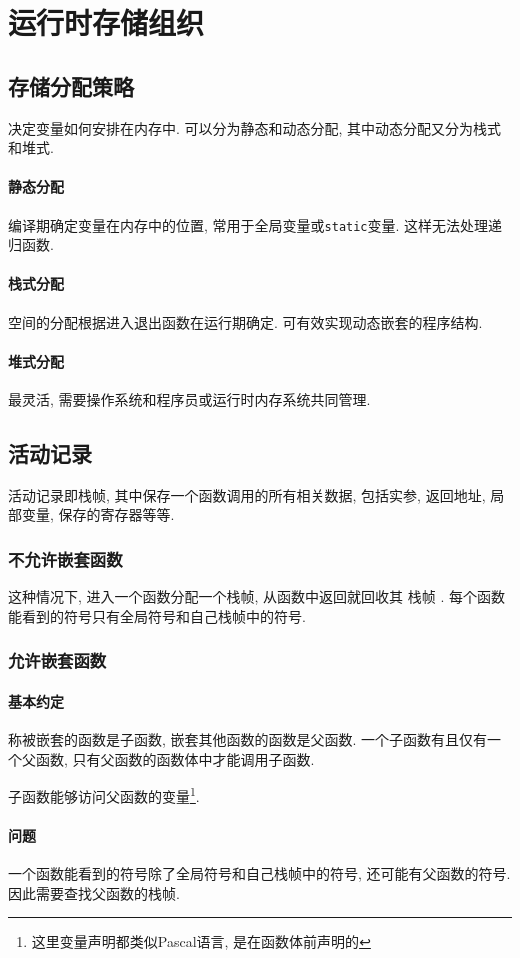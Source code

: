 \documentclass{ctexart}
\begin{document}
\section{运行时存储组织}
\subsection{存储分配策略}
    决定变量如何安排在内存中. 可以分为静态和动态分配, 其中动态分配又分为栈式和堆式.
\paragraph{静态分配} 
    编译期确定变量在内存中的位置, 常用于全局变量或\verb/static/变量.
    这样无法处理递归函数.
\paragraph{栈式分配}
    空间的分配根据进入退出函数在运行期确定.
    可有效实现动态嵌套的程序结构.
\paragraph{堆式分配}
    最灵活, 需要操作系统和程序员或运行时内存系统共同管理.
\subsection{活动记录}
    活动记录即栈帧, 其中保存一个函数调用的所有相关数据, 包括实参, 返回地址, 局部变量, 保存的寄存器等等.\par
\subsubsection{不允许嵌套函数}
    这种情况下, 进入一个函数分配一个栈帧, 从函数中返回就回收其 栈帧 .
    每个函数能看到的符号只有全局符号和自己栈帧中的符号.
\subsubsection{允许嵌套函数}
\paragraph{基本约定} 
    称被嵌套的函数是子函数, 嵌套其他函数的函数是父函数.
    一个子函数有且仅有一个父函数, 只有父函数的函数体中才能调用子函数.\par
    子函数能够访问父函数的变量\footnote{这里变量声明都类似Pascal语言, 是在函数体前声明的}.
\paragraph{问题}
    一个函数能看到的符号除了全局符号和自己栈帧中的符号, 还可能有父函数的符号.
    因此需要查找父函数的栈帧.
\end{document}
